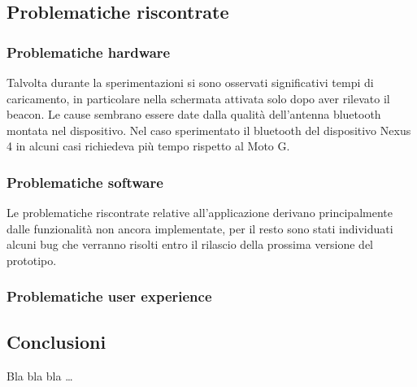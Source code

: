 \documentclass[../Sperimentazione.tex]{subfiles}
\begin{document}
			
		\newpage
			
	
		\newpage
		\subsection{Problematiche riscontrate}
		
			\subsubsection{Problematiche hardware}
				Talvolta durante la sperimentazioni si sono osservati significativi tempi di caricamento, in particolare nella schermata attivata solo dopo aver rilevato il beacon. Le cause sembrano essere date dalla qualità dell'antenna bluetooth montata nel dispositivo. Nel caso sperimentato il bluetooth del dispositivo Nexus 4 in alcuni casi richiedeva più tempo rispetto al Moto G.
		
			\subsubsection{Problematiche software}
				Le problematiche riscontrate relative all'applicazione derivano principalmente dalle funzionalità non ancora implementate, per il resto sono stati individuati alcuni bug che verranno risolti entro il rilascio della prossima versione del prototipo.
		
			\subsubsection{Problematiche user experience}
			
		\newpage
		\subsection{Conclusioni}
			Bla bla bla \dots
\end{document}
